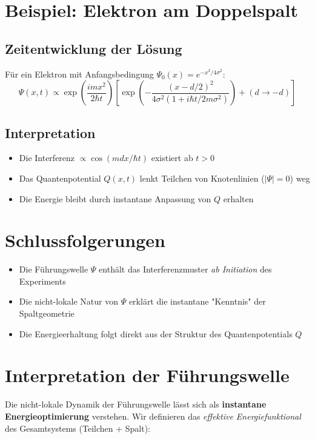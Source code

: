\documentclass[12pt]{article}
\begin{document}
\section{Beispiel: Elektron am Doppelspalt}

\subsection{Zeitentwicklung der Lösung}
Für ein Elektron mit Anfangsbedingung $\Psi_0(x) = e^{-x^2/4\sigma^2}$:
\begin{equation}
\Psi(x,t) \propto \exp\left( \frac{imx^2}{2\hbar t} \right) \left[ \exp\left( -\frac{(x-d/2)^2}{4\sigma^2(1 + i\hbar t/2m\sigma^2)} \right) + (d \to -d) \right]
\end{equation}

\subsection{Interpretation}
\begin{itemize}
\item Die Interferenz $\propto \cos(mdx/\hbar t)$ existiert ab $t > 0$
\item Das Quantenpotential $Q(x,t)$ lenkt Teilchen von Knotenlinien ($|\Psi|=0$) weg
\item Die Energie bleibt durch instantane Anpassung von $Q$ erhalten
\end{itemize}

\section{Schlussfolgerungen}
\begin{itemize}
\item Die Führungswelle $\Psi$ enthält das Interferenzmuster \textit{ab Initiation} des Experiments
\item Die nicht-lokale Natur von $\Psi$ erklärt die instantane "Kenntnis" der Spaltgeometrie
\item Die Energieerhaltung folgt direkt aus der Struktur des Quantenpotentials $Q$
\end{itemize}

\section{Interpretation der Führungswelle}
\label{sec:energetische_interpretation}

Die nicht-lokale Dynamik der Führungswelle lässt sich als \textbf{instantane Energieoptimierung} verstehen. Wir definieren das \textit{effektive Energiefunktional} des Gesamtsystems (Teilchen + Spalt):
\end{document}
